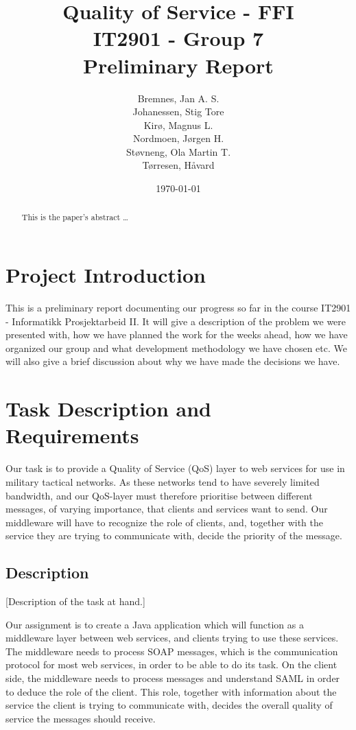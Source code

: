\documentclass[12pt]{article}
\title{
    Quality of Service - FFI \\
    IT2901 - Group 7  \\ 
    Preliminary Report \\
}
\author{
    Bremnes, Jan A. S. \\  
    Johanessen, Stig Tore \\
    Kirø, Magnus L.\\
    Nordmoen, Jørgen H.\\ 
    Støvneng, Ola Martin T.\\
    Tørresen, Håvard \\
}
\date{\today}
\begin{document}
\maketitle
\titlepage
{}
\newpage

\begin{abstract}\label{abstract}
This is the paper's abstract \ldots
\end{abstract}

\tableofcontents
\listoffigures
\listoftables
\newpage

\section{Project Introduction}\label{intoduction}
    This is a preliminary report documenting our progress so far in the course IT2901 - Informatikk Prosjektarbeid II. It will give a description of the problem we were presented with, how we have planned the work for the weeks ahead, how we have organized our group and what development methodology we have chosen etc. We will also give a brief discussion about why we have made the decisions we have.

\section{Task Description and Requirements}\label{taskdescreq} 

    Our task is to provide a Quality of Service (QoS) layer to web services for use in military tactical networks. As these networks tend to have severely limited bandwidth, and our QoS-layer must therefore prioritise between different messages, of varying importance, that clients and services want to send. Our middleware will have to recognize the role of clients, and, together with the service they are trying to communicate with, decide the priority of the message.
    
    
    \subsection{Description}\label{taskdesc} 
    [Description of the task at hand.]
        
    Our assignment is to create a Java application which will function as a middleware layer between web services, and clients trying to use these services. The middleware needs to process SOAP messages, which is the communication protocol for most web services, in order to be able to do its task. On the client side, the middleware needs to process messages and understand SAML in order to deduce the role of the client. This role, together with information about the service the client is trying to communicate with, decides the overall quality of service the messages should receive. 
\end{document}
